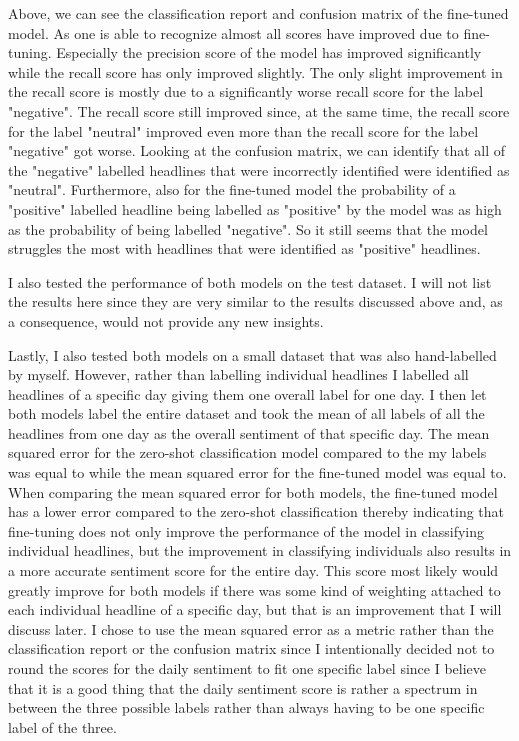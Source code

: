 \documentclass[11pt, a4paper, leqno]{article}
\begin{document}






Above, we can see the classification report and confusion matrix of the fine-tuned model. As one is able to recognize almost all scores have improved due to fine-tuning. Especially the precision score of the model has improved significantly while the recall score has only improved slightly. The only slight improvement in the recall score is mostly due to a significantly worse recall score for the label "negative". The recall score still improved since, at the same time, the recall score for the label "neutral" improved even more than the recall score for the label "negative" got worse.
Looking at the confusion matrix, we can identify that all of the "negative" labelled headlines that were incorrectly identified were identified as "neutral". Furthermore, also for the fine-tuned model the probability of a "positive" labelled headline being labelled as "positive" by the model was as high as the probability of being labelled "negative". So it still seems that the model struggles the most with headlines that were identified as "positive" headlines.

I also tested the performance of both models on the test dataset. I will not list the results here since they are very similar to the results discussed above and, as a consequence, would not provide any new insights.

Lastly, I also tested both models on a small dataset that was also hand-labelled by myself. However, rather than labelling individual headlines I labelled all headlines of a specific day giving them one overall label for one day. I then let both models label the entire dataset and took the mean of all labels of all the headlines from one day as the overall sentiment of that specific day.
The mean squared error for the zero-shot classification model compared to the my labels was equal to while the mean squared error for the fine-tuned model was equal to. When comparing the mean squared error for both models, the fine-tuned model has a lower error compared to the zero-shot classification thereby indicating that fine-tuning does not only improve the performance of the model in classifying individual headlines, but the improvement in classifying individuals also results in a more accurate sentiment score for the entire day. This score most likely would greatly improve for both models if there was some kind of weighting attached to each individual headline of a specific day, but that is an improvement that I will discuss later.
I chose to use the mean squared error as a metric rather than the classification report or the confusion matrix since I intentionally decided not to round the scores for the daily sentiment to fit one specific label since I believe that it is a good thing that the daily sentiment score is rather a spectrum in between the three possible labels rather than always having to be one specific label of the three.
\end{document}
